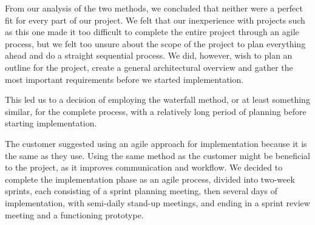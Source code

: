 
From our analysis of the two methods, we concluded that neither were a perfect fit for every part of our project. We felt that our inexperience with projects such as this one made it too difficult to complete the entire project through an agile process, but we felt too unsure about the scope of the project to plan everything ahead and do a straight sequential process. We did, however, wish to plan an outline for the project, create a general architectural overview and gather the most important requirements before we started implementation.

This led us to a decision of employing the waterfall method, or at least something similar, for the complete process, with a relatively long period of planning before starting implementation.

The customer suggested using an agile approach for implementation because it is the same as they use. Using the same method as the customer might be beneficial to the project, as it improves communication and workflow. We decided to complete the implementation phase as an agile process, divided into two-week sprints, each consisting of a sprint planning meeting, then several days of implementation, with semi-daily stand-up meetings, and ending in a sprint review meeting and a functioning prototype.